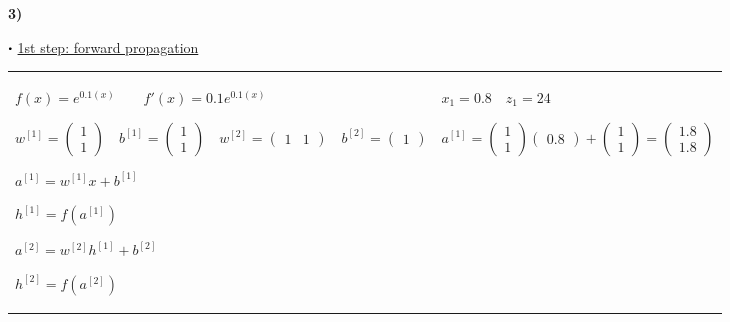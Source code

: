 \documentclass[11pt,a4paper]{article}
\newcommand\sbullet[1][.5]{\mathbin{\vcenter{\hbox{\scalebox{#1}{$\bullet$}}}}}
\begin{document}
\begin{flushleft}
\textbf{3)}
\par $\sbullet$ \underline{1st step: forward propagation} \par
\small
\begin{tabularx}{1.09\textwidth}{X X}
  \vspace{1.5mm} %
  $ f(x) = e^{0.1(x)} \quad\quad f'(x) = 0.1e^{0.1(x)} $ \par \vspace{1mm}
  $ w^{[1]} = \begin{pmatrix} 1 \\ 1 \end{pmatrix} \quad b^{[1]} = \begin{pmatrix} 1 \\ 1 \end{pmatrix} \quad w^{[2]} = \begin{pmatrix} 1 & 1 \end{pmatrix} \quad b^{[2]} = \begin{pmatrix} 1 \end{pmatrix} $ \par \vspace{1mm}
  $ a^{[1]} = w^{[1]}x + b^{[1]} $ \par \vspace{1mm}
  $ h^{[1]} = f(a^{[1]}) $ \par \vspace{1mm}
  $ a^{[2]} = w^{[2]}h^{[1]} + b^{[2]} $ \par \vspace{1mm}
  $ h^{[2]} = f(a^{[2]}) $ \par \vspace{1mm}
  & %
  $ \boxed{x_1 = 0.8} \quad z_1 = 24 $ \par \vspace{1mm}
  $ a^{[1]} = \begin{pmatrix} 1 \\ 1 \end{pmatrix} \begin{pmatrix} 0.8 \end{pmatrix} + \begin{pmatrix} 1 \\ 1 \end{pmatrix} = \begin{pmatrix} 1.8 \\ 1.8 \end{pmatrix} $ \par \vspace{1mm}

\end{tabularx}
\end{flushleft}
\end{document}
